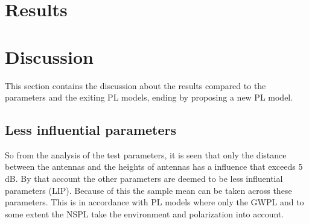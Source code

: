\section{Results}


\section{Discussion}
This section contains the discussion about the results compared to the parameters and the exiting PL models, ending by proposing a new PL model.

\subsection{Less influential parameters}

So from the analysis of the test parameters, it is seen that only the distance between the antennas and the heights of antennas has a influence that exceeds 5 dB. By that account the other parameters are deemed to be less influential parameters (LIP). Because of this the sample mean can be taken across these parameters. This is in accordance with PL models where only the GWPL and to some extent the NSPL take the environment and polarization into account.






